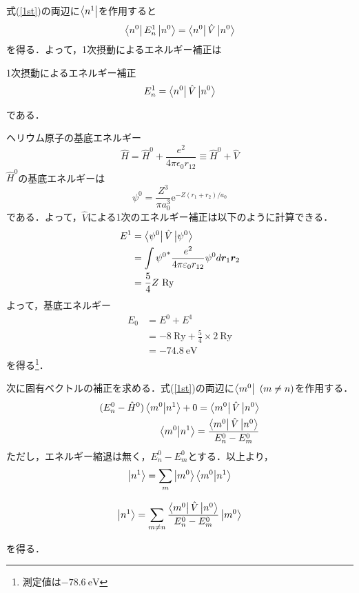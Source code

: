 \documentclass{standalone}
\begin{document}
  式(\ref{1st})の両辺に$\bra{n^1}$を作用すると
  \begin{equation}
    \bra{n^0}E_n^1\ket{n^0}=\bra{n^0}\hat{V}\ket{n^0}
  \end{equation}
  を得る．よって，1次摂動によるエネルギー補正は
  \begin{itembox}[l]{1次摂動によるエネルギー補正}
  \begin{equation}
    E_n^1=\bra{n^0}\hat{V}\ket{n^0}
  \end{equation}
  \end{itembox}
  である．
  \begin{myex}{}{}ヘリウム原子の基底エネルギー
    \begin{equation}
      \hat{H}=\hat{H}^0+\frac{e^2}{4\pi\epsilon_0r_{12}}\equiv\hat{H}^0+\hat{V}
    \end{equation}
    $\hat{H}^0$の基底エネルギーは
    \begin{equation}
      \psi^0=\frac{Z^3}{\pi a_0^3}\mathrm{e}^{-Z(r_1+r_2)/a_0}
    \end{equation}
    である．よって，$\hat{V}$による1次のエネルギー補正は以下のように計算できる．
    \begin{align}
      E^1&=\bra{\psi^0}\hat{V}\ket{\psi^0}\\
      &=\int{\psi^0}^{*}\frac{e^2}{4\pi\varepsilon_0r_{12}}\psi^0d\bm{r}_1\bm{r}_2\\
      &=\frac{5}{4}Z\ \mathrm{Ry}
    \end{align}
    よって，基底エネルギー
    \begin{align}
      E_0&=E^0+E^1\\
      &=-8\ \mathrm{Ry}+\frac{5}{4}\times{2}\ \mathrm{Ry}\\
      &=-74.8\ \mathrm{eV}
    \end{align}
    を得る\footnote{測定値は$-78.6\ \mathrm{eV}$}．
  \end{myex}
  次に固有ベクトルの補正を求める．式(\ref{1st})の両辺に$\bra{m^0}\ (m\ne n)$を作用する．
  \begin{align}
    (E_n^0-\hat{H}^0)\bra{m^0}\ket{n^1}+0=\bra{m^0}\hat{V}\ket{n^0}\\
    \braket{m^0}{n^1}=\frac{\bra{m^0}\hat{V}\ket{n^0}}{E_n^0-E_m^0}\\
  \end{align}
  ただし，エネルギー縮退は無く，$E_n^0-E_m^0$とする．以上より，
  \begin{equation}
    \ket{n^1}=\sum_{m}\ket{m^0}\braket{m^0}{n^1}
  \end{equation}
  \begin{screen}
  \begin{equation}
    \ket{n^1}=\sum_{m\ne n}\frac{\bra{m^0}\hat{V}\ket{n^0}}{E_n^0-E_m^0}\ket{m^0}
  \end{equation}
  \end{screen}
  を得る．
\end{document}
